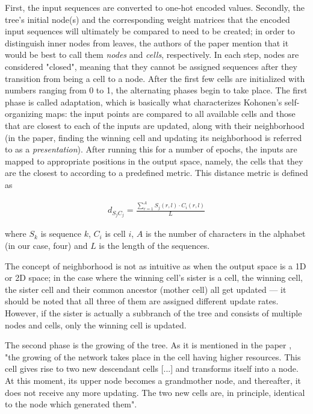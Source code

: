 \documentclass[11pt,twocolumn]{article}
\begin{document}
First, the input sequences are converted to one-hot encoded values. Secondly, the tree's initial node(s) and the corresponding weight matrices that the encoded input sequences will ultimately be compared to need to be created; in order to distinguish inner nodes from leaves, the authors of the paper mention that it would be best to call them \textit{nodes} and \textit{cells}, respectively. In each step, nodes are considered "closed", meaning that they cannot be assigned sequences after they transition from being a cell to a node. After the first few cells are initialized with numbers ranging from 0 to 1, the alternating phases begin to take place. The first phase is called adaptation, which is basically what characterizes Kohonen's self-organizing maps: the input points are compared to all available cells and those that are closest to each of the inputs are updated, along with their neighborhood (in the paper, finding the winning cell and updating its neighborhood is referred to as a \textit{presentation}). After running this for a number of epochs, the inputs are mapped to appropriate positions in the output space, namely, the cells that they are the closest to according to a predefined metric. This distance metric is defined as

\begin{align}
d_{S_j C_j} = \frac{\sum_{r = 1}^A S_j(r, l) \cdot C_i(r, l)}{L}
\end{align}

where $S_k$ is sequence $k$, $C_i$ is cell $i$, $A$ is the number of characters in the alphabet (in our case, four) and $L$ is the length of the sequences.

The concept of neighborhood is not as intuitive as when the output space is a 1D or 2D space; in the case where the winning cell's sister is a cell, the winning cell, the sister cell and their common ancestor (mother cell) all get updated — it should be noted that all three of them are assigned different update rates. However, if the sister is actually a subbranch of the tree and consists of multiple nodes and cells, only the winning cell is updated.

The second phase is the growing of the tree. As it is mentioned in the paper \cite{Dopazo1997}, "the growing of the network takes place in the cell having higher resources. This cell gives rise to two new descendant cells [...] and transforms itself into a node. At this moment, its upper node becomes a grandmother node, and thereafter, it does not receive any more updating. The two new cells are, in principle, identical to the node which generated them".
\end{document}
